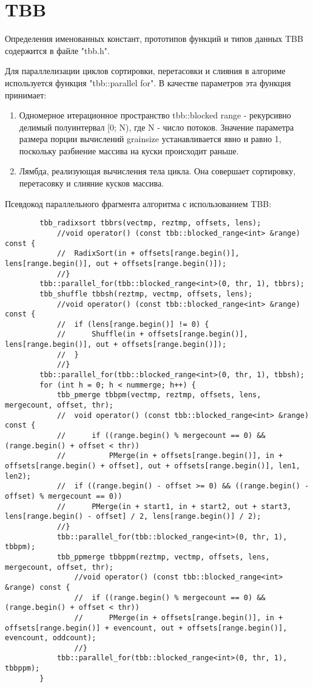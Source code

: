 \documentclass{report}
\begin{document}
	\section*{TBB}
	Определения именованных констант, прототипов функций и типов данных TBB содержится в файле "tbb.h".
	\par Для параллелизации циклов сортировки, перетасовки и слияния в алгориме используется функция "tbb::parallel for". В качестве параметров эта функция принимает:
	\begin{enumerate}
		\item Одномерное итерационное пространство tbb::blocked range - рекурсивно делимый полуинтервал [0; N), где N - число потоков. Значение параметра размера порции вычислений grainsize устанавливается явно и равно 1, поскольку разбиение массива на куски происходит раньше.
		\item Лямбда, реализующая вычисления тела цикла. Она совершает сортировку, перетасовку и слияние кусков массива.
	\end{enumerate}
	\par Псевдокод параллельного фрагмента алгоритма с использованием TBB:
	\begin{lstlisting}
		tbb_radixsort tbbrs(vectmp, reztmp, offsets, lens);
			//void operator() (const tbb::blocked_range<int> &range) const {
			//	RadixSort(in + offsets[range.begin()], lens[range.begin()], out + offsets[range.begin()]);
			//}
		tbb::parallel_for(tbb::blocked_range<int>(0, thr, 1), tbbrs);
		tbb_shuffle tbbsh(reztmp, vectmp, offsets, lens);
			//void operator() (const tbb::blocked_range<int> &range) const {
			//	if (lens[range.begin()] != 0) {
			//		Shuffle(in + offsets[range.begin()], lens[range.begin()], out + offsets[range.begin()]);
			//	}
			//}
		tbb::parallel_for(tbb::blocked_range<int>(0, thr, 1), tbbsh);
		for (int h = 0; h < nummerge; h++) {
			tbb_pmerge tbbpm(vectmp, reztmp, offsets, lens, mergecount, offset, thr);
			//	void operator() (const tbb::blocked_range<int> &range) const {
			//		if ((range.begin() % mergecount == 0) && (range.begin() + offset < thr))
			//			PMerge(in + offsets[range.begin()], in + offsets[range.begin() + offset], out + offsets[range.begin()], len1, len2);
			//	if ((range.begin() - offset >= 0) && ((range.begin() - offset) % mergecount == 0)) 
			//		PMerge(in + start1, in + start2, out + start3, lens[range.begin() - offset] / 2, lens[range.begin()] / 2);
			//}	
			tbb::parallel_for(tbb::blocked_range<int>(0, thr, 1), tbbpm);
			tbb_ppmerge tbbppm(reztmp, vectmp, offsets, lens, mergecount, offset, thr);
				//void operator() (const tbb::blocked_range<int> &range) const {
				//	if ((range.begin() % mergecount == 0) && (range.begin() + offset < thr)) 
				//		PMerge(in + offsets[range.begin()], in + offsets[range.begin()] + evencount, out + offsets[range.begin()], evencount, oddcount);
				//}
			tbb::parallel_for(tbb::blocked_range<int>(0, thr, 1), tbbppm);
		}
	\end{lstlisting}
	\newpage
	
\end{document}
